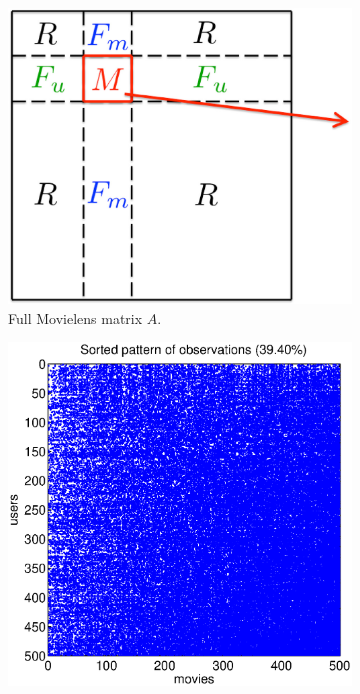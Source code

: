 \documentclass{article}
\begin{document}
\begin{figure}
        \begin{subfigure}[b]{.5\linewidth}
            \centering \includegraphics[scale=.175]{movielens_blocks_v2.eps}
	\vspace{-0.25cm}
            \vspace{0.65cm}
            \caption{Full Movielens matrix $A$.}\label{fig:movielens_blocks}
	\vspace{-0.15cm}
          \end{subfigure}
          \begin{subfigure}[b]{.5\linewidth}
            \centering\includegraphics[scale=.3]{observation_pattern_40.eps}

\end{subfigure}
\end{figure}
\end{document}

